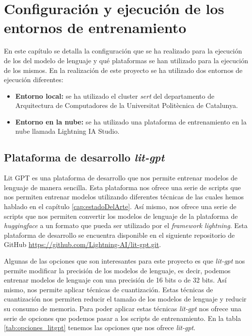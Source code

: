 \chapter{Configuración y ejecución de los entornos de entrenamiento}
\label{cap:configuracion_ejecucion}


En este capítulo se detalla la configuración que se ha realizado para la ejecución de los
del modelo de lenguaje y qué plataformas se han utilizado para la ejecución de los mismos.
En la realización de este proyecto se ha utilizado dos entornos de ejecución diferentes:

\begin{itemize}
    \item \textbf{Entorno local:} se ha utilizado el cluster \textit{sert} del departamento
        de Arquitectura de Computadores de la Universitat Politècnica de Catalunya.
    \item \textbf{Entorno en la nube:} se ha utilizado una plataforma de entrenamiento en la nube
        llamada Lightning IA Studio.
\end{itemize}

\section{Plataforma de desarrollo \textit{lit-gpt}}
\label{sec:lit_gpt}


Lit GPT es una plataforma de desarrollo que nos permite entrenar modelos de
lenguaje de manera sencilla. Esta plataforma nos ofrece una serie de scripts que nos
permiten entrenar modelos utilizando diferentes técnicas de las cuales hemos hablado
en el capítulo \ref{cap:estadoDelArte}. Así mismo, nos ofrece una serie de scripts que nos permiten convertir
los modelos de lenguaje de la plataforma de \textit{huggingface} a un formato que pueda
ser utilizado por el \textit{framework lightning}. Esta plataforma de desarrollo se encuentra
disponible en el siguiente repositorio de GitHub \url{https://github.com/Lightning-AI/lit-gpt.git}.

Algunas de las opciones que son interesantes para este proyecto es que \textit{lit-gpt} nos
permite modificar la precisión de los modelos de lenguaje, es decir, podemos entrenar
modelos de lenguaje con una precisión de 16 bits o de 32 bits. Así mismo, nos permite
aplicar técnicas de cuantización. Estas técnicas de cuantización nos permiten reducir
el tamaño de los modelos de lenguaje y reducir su consumo de memoria.
Para poder aplicar estas técnicas \textit{lit-gpt} nos ofrece una serie de opciones que
podemos pasar a los scripts de entrenamiento. En la tabla \ref{tab:opciones_litgpt} 
tenemos las opciones que nos ofrece \textit{lit-gpt}.

